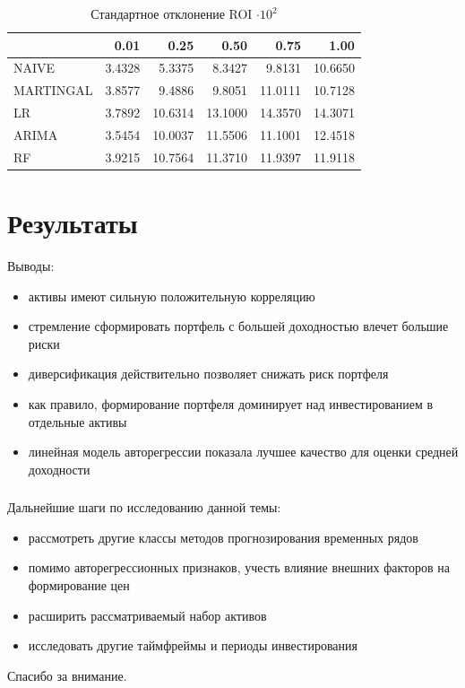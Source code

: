 \documentclass{beamer}
\begin{document}
\begin{frame}
    \begin{table}[H]
        \caption{Стандартное отклонение ROI $\cdot 10^2$}
        \label{tab:roi_std}
        \begin{tabular}{lrrrrr}
            \toprule
            &  0.01 &  0.25 &  0.50 &  0.75 &  1.00 \\
            \midrule
            NAIVE & 3.4328 & 5.3375 & 8.3427 & 9.8131 & 10.6650 \\
            MARTINGAL & 3.8577 & 9.4886 & 9.8051 & 11.0111 & 10.7128 \\
            LR & 3.7892 & 10.6314 & 13.1000 & 14.3570 & 14.3071 \\
            ARIMA & 3.5454 & 10.0037 & 11.5506 & 11.1001 & 12.4518 \\
            RF & 3.9215 & 10.7564 & 11.3710 & 11.9397 & 11.9118 \\
            \bottomrule
        \end{tabular}
    \end{table}
\end{frame}

\section{Результаты}

\begin{frame}
    Выводы:
    \begin{itemize}
        \item активы имеют сильную положительную корреляцию
        \item стремление сформировать портфель с большей доходностью влечет большие риски
        \item диверсификация действительно позволяет снижать риск портфеля
        \item как правило, формирование портфеля доминирует над инвестированием в отдельные активы
        \item линейная модель авторегрессии показала лучшее качество для оценки средней доходности
    \end{itemize}
\end{frame}

\begin{frame}
    \frametitle{}
    Дальнейшие шаги по исследованию данной темы:
    \begin{itemize}
        \item рассмотреть другие классы методов прогнозирования временных рядов
        \item помимо авторегрессионных признаков, учесть влияние внешних факторов на формирование цен
        \item расширить рассматриваемый набор активов
        \item исследовать другие таймфреймы и периоды инвестирования
    \end{itemize}
\end{frame}

\begin{frame}
    \centering
    Спасибо за внимание.
\end{frame}
\end{document}
